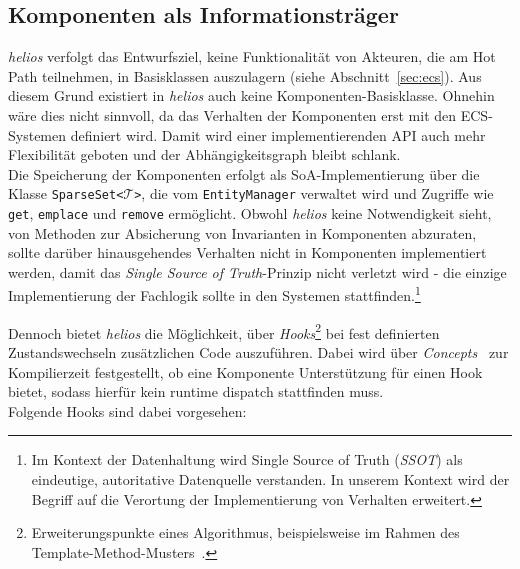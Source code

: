 \subsection{Komponenten als Informationsträger}\label{sec:components}

\textit{helios} verfolgt das Entwurfsziel, keine Funktionalität von Akteuren, die am Hot Path teilnehmen, in Basisklassen auszulagern (siehe Abschnitt~\ref{sec:ecs}).
Aus diesem Grund existiert in \textit{helios} auch keine Komponenten-Basisklasse.
Ohnehin wäre dies nicht sinnvoll, da das Verhalten der Komponenten erst mit den ECS-Systemen definiert wird.
Damit wird einer implementierenden API auch mehr Flexibilität geboten und der Abhängigkeitsgraph bleibt schlank.\\

Die Speicherung der Komponenten erfolgt als SoA-Implementierung über die Klasse \texttt{SparseSet<}\(\mathcal{T}\)\texttt{>}, die vom \texttt{EntityManager} verwaltet wird und Zugriffe wie \texttt{get}, \texttt{emplace} und \texttt{remove} ermöglicht.
Obwohl \textit{helios} keine Notwendigkeit sieht, von Methoden zur Absicherung von Invarianten in Komponenten abzuraten, sollte darüber hinausgehendes Verhalten nicht in Komponenten implementiert werden, damit das \textit{Single Source of Truth}-Prinzip nicht verletzt wird - die einzige Implementierung der Fachlogik sollte in den Systemen stattfinden.\footnote{
    Im Kontext der Datenhaltung wird Single Source of Truth (\textit{SSOT}) als eindeutige, autoritative Datenquelle verstanden.
    In unserem Kontext wird der Begriff auf die Verortung der Implementierung von Verhalten erweitert.
}

Dennoch bietet \textit{helios} die Möglichkeit, über \textit{Hooks}\footnote{
    Erweiterungspunkte eines Algorithmus, beispielsweise im Rahmen des Template-Method-Musters~\cite[S.~325-330]{GHJV94}.
} bei fest definierten Zustandswechseln zusätzlichen Code auszuführen.
Dabei wird über \textit{Concepts}~\cite[S. 107-112]{Str18} zur Kompilierzeit festgestellt, ob eine Komponente Unterstützung für einen Hook bietet, sodass hierfür kein runtime dispatch stattfinden muss.\\

Folgende Hooks sind dabei vorgesehen:

